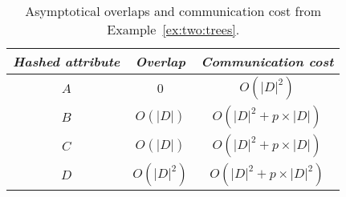 \begin{table}[t]\centering
\begin{tabular}{|c||c|c|}\hline
\em Hashed attribute & \em Overlap & \em Communication cost\\\hline\hline
$A$ & $0$ & $O(|D|^2)$\\\hline
$B$ & $O(|D|)$ & $O(|D|^2 + p\times|D|)$\\\hline
$C$ & $O(|D|)$ & $O(|D|^2 + p\times|D|)$\\\hline
$D$ & $O(|D|^2)$ & $O(|D|^2 + p\times|D|^2)$\\\hline
\end{tabular}
\caption{\label{table:overlaps}Asymptotical overlaps and communication cost from Example~\ref{ex:two:trees}.}
\end{table}





